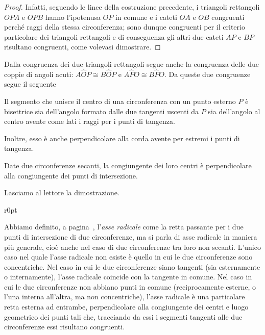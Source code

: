\begin{proof}
Infatti, seguendo le linee della costruzione precedente, i triangoli 
rettangoli $OPA$ e $OPB$ hanno l'ipotenusa $OP$ in comune e i cateti 
$OA$ e $OB$ congruenti perché raggi della stessa circonferenza; sono 
dunque congruenti per il criterio particolare dei triangoli 
rettangoli e di conseguenza gli altri due cateti $AP$ e $BP$ 
risultano congruenti, come volevasi dimostrare.
\end{proof}

Dalla congruenza dei due triangoli rettangoli segue anche la 
congruenza delle due coppie di angoli acuti: $A\widehat{O}P\cong 
B\widehat{O}P$ e $A\widehat{P}O\cong B\widehat{P}O$. Da queste due 
congruenze segue il seguente 
\begin{corollario}\label{cor:5.1}
Il segmento che unisce il centro di una circonferenza con un punto 
esterno $P$ è bisettrice sia dell'angolo formato dalle due tangenti 
uscenti da $P$ sia dell'angolo al centro avente come lati i raggi per 
i punti di tangenza.
\end{corollario}
Inoltre, esso è anche perpendicolare alla corda avente per estremi i 
punti di tangenza.

\begin{corollario}
Date due circonferenze secanti, la congiungente dei loro centri è 
perpendicolare alla congiungente dei punti di intersezione.
\end{corollario}

Lasciamo al lettore la dimostrazione.

\begin{wrapfigure}{r}{0pt}
	\centering
\end{wrapfigure}
Abbiamo definito, a pagina~\pageref{def:asse_radicale}, l'\emph{asse 
radicale} come la retta passante per i due punti di intersezione di 
due circonferenze, ma si parla di asse radicale in maniera più 
generale, cioè anche nel caso di due circonferenze tra loro non 
secanti. L'unico caso nel quale l'asse radicale non esiste è quello 
in cui le due circonferenze sono concentriche.
Nel caso in cui le due circonferenze siano tangenti (sia esternamente 
o internamente), l'asse radicale coincide con la tangente in comune.
Nel caso in cui le due circonferenze non abbiano punti in comune 
(reciprocamente esterne, o l'una interna all'altra, ma non 
concentriche), l'asse radicale è una particolare retta esterna ad 
entrambe, perpendicolare alla congiungente dei centri e luogo 
geometrico dei punti tali che, tracciando da essi i segmenti tangenti 
alle due circonferenze essi risultano congruenti.


